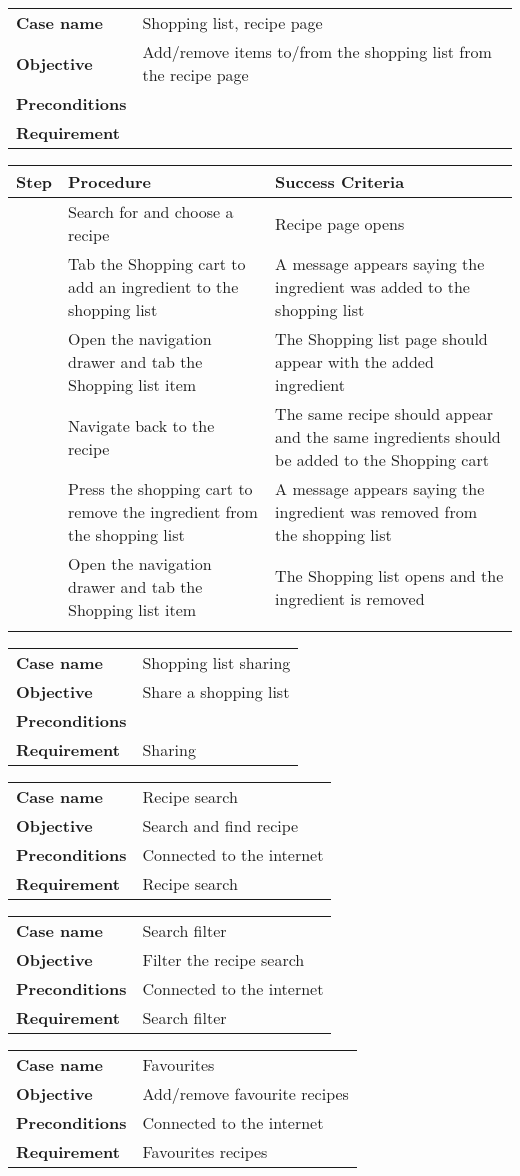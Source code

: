 \documentclass[a4paper,12pt]{report}
\newcommand{\testcase}[4]
{
\begin{center}
\begin{tabular}{p{2.6cm} p{10cm}}
\hline
\textbf{Case name} & #1\\
\textbf{Objective} & #2\\
\textbf{Preconditions} & #3\\
\textbf{Requirement} & #4\\
\hline
\end{tabular}
\end{center}
}
\newcounter{counter}
\newenvironment{testprocedure}%
{\newcommand{\step}{\arabic{counter}\stepcounter{counter}}
\setcounter{counter}{1}
\begin{center}
\begin{tabular}{| c | p{5.4cm} | p{5.4cm} |}
\hline
\textbf{Step} & \textbf{Procedure} & \textbf{Success Criteria}\\
\hline}
{\hline
\multicolumn{3}{c}{} \\%
\end{tabular}
\end{center}}
\begin{document}
\testcase
{Shopping list, recipe page}
{Add/remove items to/from the shopping list from the recipe page}
{}
{}

\begin{testprocedure}
\step & Search for and choose a recipe & Recipe page opens \\ 
\hline
\step & Tab the Shopping cart to add an ingredient to the shopping list & A message appears saying the ingredient was added to the shopping list \\
\hline
\step & Open the navigation drawer and tab the Shopping list item  & The Shopping list page should appear with the added ingredient \\
\hline
\step & Navigate back to the recipe & The same recipe should appear and the same ingredients should be added to the Shopping cart \\
\hline
\step & Press the shopping cart to remove the ingredient from the shopping list & A message appears saying the ingredient was removed from the shopping list \\
\hline
\step & Open the navigation drawer and tab the Shopping list item & The Shopping list opens and the ingredient is removed \\ 
\end{testprocedure}


\testcase
{Shopping list sharing}
{Share a shopping list}
{}
{Sharing}

\testcase
{Recipe search}
{Search and find recipe}
{Connected to the internet}
{Recipe search}

\testcase
{Search filter}
{Filter the recipe search}
{Connected to the internet}
{Search filter}

\testcase
{Favourites}
{Add/remove favourite recipes}
{Connected to the internet}
{Favourites recipes}
\end{document}

